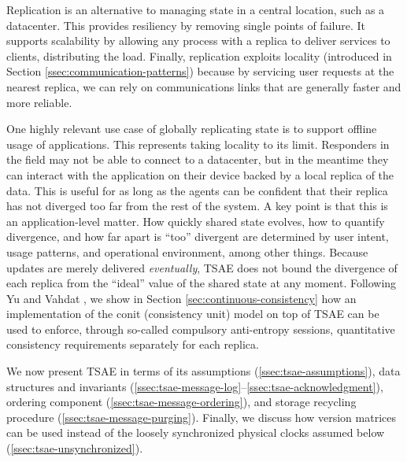 \documentclass[]             %
{NASA}                       %
\theoremstyle{definition}
\begin{document}

Replication is an alternative to managing state in a central location,
such as a datacenter. This provides resiliency by removing single
points of failure. It supports scalability by allowing any process
with a replica to deliver services to clients, distributing the
load. Finally, replication exploits locality (introduced in Section
\ref{ssec:communication-patterns}) because by servicing user requests
at the nearest replica, we can rely on communications links that are
generally faster and more reliable.

One highly relevant use case of globally replicating state is to
support offline usage of applications. This represents taking locality
to its limit. Responders in the field may not be able to connect to a
datacenter, but in the meantime they can interact with the application
on their device backed by a local replica of the data. This is useful
for as long as the agents can be confident that their replica has not
diverged too far from the rest of the system. A key point is that this
is an application-level matter. How quickly shared state evolves, how
to quantify divergence, and how far apart is ``too'' divergent are
determined by user intent, usage patterns, and operational
environment, among other things. Because updates are merely delivered
\emph{eventually}, TSAE does not bound the divergence of each replica
from the ``ideal'' value of the shared state at any moment. Following Yu
and Vahdat \cite{2002tact}, we show in Section
\ref{sec:continuous-consistency} how an implementation of the conit
(consistency unit) model on top of TSAE can be used to enforce,
through so-called compulsory anti-entropy sessions, quantitative
consistency requirements separately for each replica.

We now present TSAE in terms of its assumptions
(\ref{ssec:tsae-assumptions}), data structures and invariants
(\ref{ssec:tsae-message-log}--\ref{ssec:tsae-acknowledgment}),
ordering component (\ref{ssec:tsae-message-ordering}), and storage
recycling procedure (\ref{ssec:tsae-message-purging}). Finally, we
discuss how version matrices can be used instead of the loosely
synchronized physical clocks assumed below
(\ref{ssec:tsae-unsynchronized}).
\end{document}
